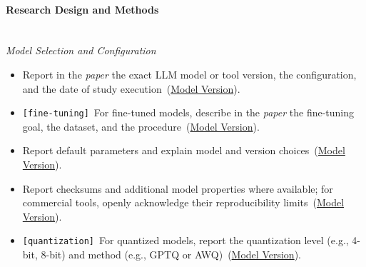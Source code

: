 \documentclass[smallextended]{svjour3}
\makeatletter
\newcommand{\must}{\textbf{must}\xspace}
\newcommand{\should}{\textbf{should}\xspace}
\newcommand{\shouldnot}{\textbf{should not}\xspace}
\newcommand{\paper}{\emph{paper}\xspace}
\newcommand{\paper}{\emph{paper}\xspace}
\newcommand{\iconM}{\usebox{\iconMbox}\xspace}
\newcommand{\iconS}{\usebox{\iconSbox}\xspace}
\newcommand{\iconM}{●\xspace}
\newcommand{\iconS}{○\xspace}
\newcommand{\condition}[1]{\texttt{\small[#1]}\,}
\newcommand{\condition}[1]{@@cond:#1@@}
\newcommand{\refmodelversion}{\hyperref[sec:report-model-version-configuration-and-customizations]{Model Version}}
\newcommand{\refmodelversion}{\href{/guidelines/model-version/}{Model Version}}
\makeatother
\begin{document}
\begin{appendices}
\paragraph{\textbf{Research Design and Methods}}\mbox{}\\
\noindent\textit{Model Selection and Configuration}
\begin{itemize}[label={},leftmargin=*]
    \item \iconM Report in the \paper the exact LLM model or tool version, the configuration, and the date of study execution~(\refmodelversion).
    \item \iconM \condition{fine-tuning} For fine-tuned models, describe in the \paper the fine-tuning goal, the dataset, and the procedure~(\refmodelversion).
    \item \iconS Report default parameters and explain model and version choices~(\refmodelversion).
    \item \iconS Report checksums and additional model properties where available; for commercial tools, openly acknowledge their reproducibility limits~(\refmodelversion).
    \item \iconS \condition{quantization} For quantized models, report the quantization level (e.g., 4-bit, 8-bit) and method (e.g., GPTQ or AWQ)~(\refmodelversion).

\end{itemize}
\end{appendices}
\end{document}
